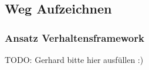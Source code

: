 \subsection{Weg Aufzeichnen}
\label{weg-aufzeichnen}

\subsubsection{Ansatz Verhaltensframework}

TODO: Gerhard bitte hier ausfüllen :)